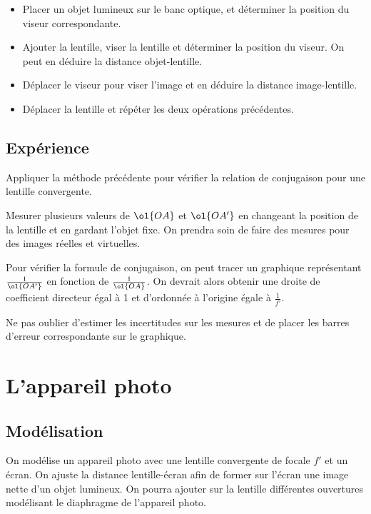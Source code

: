 \documentclass[a4paper]{tp}
\begin{document}
\begin{itemize}
  \item Placer un objet lumineux sur le banc optique, et déterminer la position du viseur correspondante.

  \item Ajouter la lentille, viser la lentille et déterminer la position du viseur. On peut en déduire la distance objet-lentille.

  \item Déplacer le viseur pour viser l'image et en déduire la distance image-lentille.

  \item Déplacer la lentille et répéter les deux opérations précédentes.
\end{itemize}

\subsection{Expérience}%
\label{sub:experience}
Appliquer la méthode précédente pour vérifier la relation de conjugaison pour une lentille convergente.

Mesurer plusieurs valeurs de $\ol{OA}$  et $\ol{OA'}$ en changeant la position de la lentille et en gardant l'objet fixe. On prendra soin de faire des mesures pour des images réelles et virtuelles.

Pour vérifier la formule de conjugaison, on peut tracer un graphique représentant $\frac{1}{\ol{OA'}}$ en fonction de $\frac{1}{\ol{OA}}$. On devrait alors obtenir une droite de coefficient directeur égal à 1 et d'ordonnée à l'origine égale à $\frac{1}{f'}$.

Ne pas oublier d'estimer les incertitudes sur les mesures et de placer les barres d'erreur correspondante sur le graphique.

\section{L'appareil photo}%
\label{sec:l_appareil_photo}

\subsection{Modélisation}%
\label{sub:modelisation}

On modélise un appareil photo avec une lentille convergente de focale $f'$ et un écran. On ajuste la distance lentille-écran afin de former sur l'écran une image nette d'un objet lumineux. On pourra ajouter sur la lentille différentes ouvertures modélisant le diaphragme de l'appareil photo.
\end{document}
